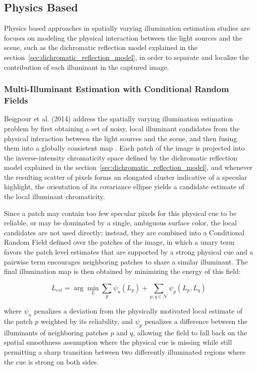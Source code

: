 \subsection{Physics Based}
\label{sec:physics_based_approaches}

Physics based approaches in spatially varying illumination estimation studies are focuses on modeling the physical interaction between the light sources and the scene, such as the dichromatic reflection model explained in the section~\ref{sec:dichromatic_reflection_model}, in order to separate and localize the contribution of each illuminant in the captured image.

\subsubsection{Multi-Illuminant Estimation with Conditional Random Fields}

Beigpour et al. (2014) address the spatially varying illumination estimation problem by first obtaining a set of noisy, local illuminant candidates from the physical interaction between the light sources and the scene, and then fusing them into a globally consistent map \cite{mimoAndConditionalRandomFields}. Each patch of the image is projected into the inverse-intensity chromaticity space defined by the dichromatic reflection model explained in the section~\ref{sec:dichromatic_reflection_model}, and whenever the resulting scatter of pixels forms an elongated cluster indicative of a specular highlight, the orientation of its covariance ellipse yields a candidate estimate of the local illuminant chromaticity.

Since a patch may contain too few specular pixels for this physical cue to be reliable, or may be dominated by a single, ambiguous surface color, the local candidates are not used directly; instead, they are combined into a Conditional Random Field defined over the patches of the image, in which a unary term favors the patch level estimates that are supported by a strong physical cue and a pairwise term encourages neighboring patches to share a similar illuminant. The final illumination map is then obtained by minimizing the energy of this field:

\begin{equation}
L_{est} = \arg\min_{L} \sum_{p} \psi_u(L_p) + \sum_{p, q \in \mathcal{N}} \psi_p(L_p, L_q)
\end{equation}

where $\psi_u$ penalizes a deviation from the physically motivated local estimate of the patch $p$ weighted by its reliability, and $\psi_p$ penalizes a difference between the illuminants of neighboring patches $p$ and $q$, allowing the field to fall back on the spatial smoothness assumption where the physical cue is missing while still permitting a sharp transition between two differently illuminated regions where the cue is strong on both sides.

